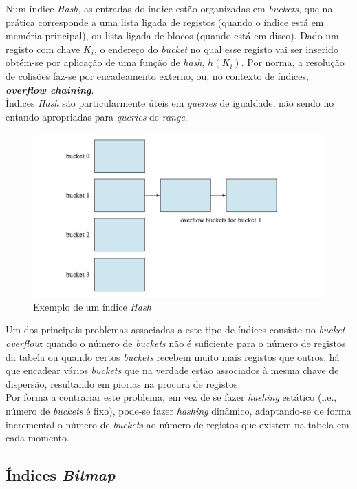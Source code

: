 \documentclass[oneside]{book}
\theoremstyle{definition}
\begin{document}
Num índice \textit{Hash}, as entradas do índice estão organizadas em \textit{buckets}, que na prática corresponde a uma lista ligada de registos (quando o índice está em memória principal), ou lista ligada de blocos (quando está em disco). Dado um registo com chave $K_i$, o endereço do \textit{bucket} no qual esse registo vai ser inserido obtém-se por aplicação de uma função de \textit{hash}, $h(K_i)$. Por norma, a resolução de colisões faz-se por encadeamento externo, ou, no contexto de índices, \textbf{\textit{overflow chaining}}.\\
Índices \textit{Hash} são particularmente úteis em \textit{queries} de igualdade, não sendo no entando apropriadas para \textit{queries} de \textit{range}.

\begin{figure}[H]
    \centering
    \includegraphics[scale = 0.60]{cap_indices/hash_index.png}
    \caption{Exemplo de um índice \textit{Hash}}
\end{figure}

Um dos principais problemas associadas a este tipo de índices consiste no \textit{bucket overflow}: quando o número de \textit{buckets} não é suficiente para o número de registos da tabela ou quando certos \textit{buckets} recebem muito mais registos que outros, há que encadear vários \textit{buckets} que na verdade estão associados à mesma chave de dispersão, resultando em piorias na procura de registos. \\
Por forma a contrariar este problema, em vez de se fazer \textit{hashing} estático (i.e., número de \textit{buckets} é fixo), pode-se fazer  \textit{hashing} dinâmico, adaptando-se de forma incremental o número de \textit{buckets} ao número de registos que existem na tabela em cada momento.

\subsection{Índices \textit{Bitmap}}
\end{document}
